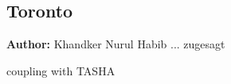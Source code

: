 \subsection{Toronto}
\label{ch:scenarios:toronto}
\hfill \textbf{Author:} Khandker Nurul Habib ... zugesagt

\citep[][]{GaoWEtAl_TRR_2010} coupling with TASHA

